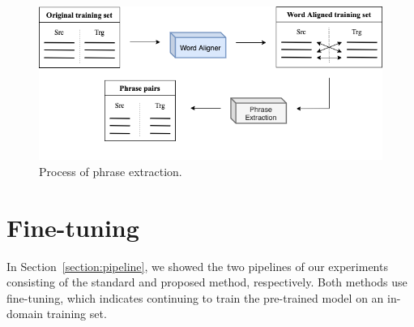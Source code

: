 
\begin{figure}[h]
    \centering
    \includegraphics[scale=0.46]{images/phrase_extraction.png}
    \caption{Process of phrase extraction.}
    \label{fig:phrase_extraction}
\end{figure}

\section{Fine-tuning}\label{section:fine-tuning}

In Section~\ref{section:pipeline}, we showed the two pipelines of our experiments consisting of the standard and proposed method, respectively. Both methods use fine-tuning, which indicates continuing to train the pre-trained model on an in-domain training set.


